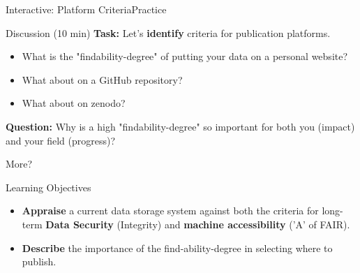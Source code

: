 \begin{frame}{Interactive: Platform Criteria}{Practice}
    \begin{block}{Discussion (10 min)}
        \textbf{Task:} Let's \textbf{identify} criteria for publication platforms.
        \begin{itemize}
            \item What is the "findability-degree" of putting your data on a personal website?
            \pause
            \item What about on a GitHub repository?
            \pause
            \item What about on zenodo?
        \end{itemize}
        \pause
        \textbf{Question:} Why is a high "findability-degree" so important for both you (impact) and your field (progress)?
    \end{block}
    More? \cite{koubaa_energy_2025}
\end{frame}

\begin{frame}{Learning Objectives}
    \begin{itemize}
        \item \textbf{Appraise} a current data storage system against both the criteria for long-term \textbf{Data Security} (Integrity) and \textbf{machine accessibility} ('A' of FAIR).
        \item \textbf{Describe} the importance of the find-ability-degree in selecting where to publish.
    \end{itemize}
\end{frame}

